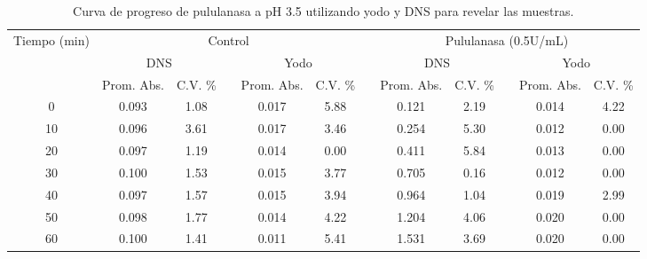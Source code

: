 \documentclass{article}
\begin{document}
\begin{table}[H]
	\centering
	\caption{Curva de progreso de pululanasa a pH 3.5 utilizando yodo y DNS para revelar las muestras.}
		\begin{adjustbox}{width=\textwidth}
	\begin{tabular}{cccccccccccc}
		\toprule
		\multirow{3}[6]{*}{Tiempo (min)} & \multicolumn{5}{c}{Control}           &       & \multicolumn{5}{c}{Pululanasa (0.5U/mL)} \\
		\cmidrule{2-6}\cmidrule{8-12}          & \multicolumn{2}{c}{DNS} &       & \multicolumn{2}{c}{Yodo} &       & \multicolumn{2}{c}{DNS} &       & \multicolumn{2}{c}{Yodo} \\
		\cmidrule{2-3}\cmidrule{5-6}\cmidrule{8-9}\cmidrule{11-12}          & Prom. Abs. & C.V. \% &       & Prom. Abs. & C.V. \% &       & Prom. Abs. & C.V. \% &       & Prom. Abs. & C.V. \% \\
		\midrule
		0     & 0.093 & 1.08  &       & 0.017 & 5.88  &       & 0.121 & 2.19  &       & 0.014 & 4.22 \\
		10    & 0.096 & 3.61  &       & 0.017 & 3.46  &       & 0.254 & 5.30  &       & 0.012 & 0.00 \\
		20    & 0.097 & 1.19  &       & 0.014 & 0.00  &       & 0.411 & 5.84  &       & 0.013 & 0.00 \\
		30    & 0.100 & 1.53  &       & 0.015 & 3.77  &       & 0.705 & 0.16  &       & 0.012 & 0.00 \\
		40    & 0.097 & 1.57  &       & 0.015 & 3.94  &       & 0.964 & 1.04  &       & 0.019 & 2.99 \\
		50    & 0.098 & 1.77  &       & 0.014 & 4.22  &       & 1.204 & 4.06  &       & 0.020 & 0.00 \\
		60    & 0.100 & 1.41  &       & 0.011 & 5.41  &       & 1.531 & 3.69  &       & 0.020 & 0.00 \\
		\bottomrule
	\end{tabular}%
	\end{adjustbox}
	\label{tab:b4}%
\end{table}%
\end{document}
